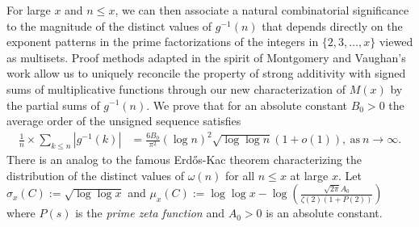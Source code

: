\documentclass[10pt,reqno,letterpaper]{article}
\theoremstyle{plain}
\numberwithin{theorem}{section}
\theoremstyle{definition}
\begin{document}
For large $x$ and $n \leq x$, we can then associate a natural combinatorial 
significance to the magnitude of the distinct values of 
$g^{-1}(n)$ that depends directly on the exponent patterns in the 
prime factorizations of the integers in $\{2,3,\ldots,x\}$ viewed as multisets.
Proof methods adapted in the spirit of Montgomery and Vaughan's work \cite{MV} 
allow us to uniquely reconcile the property of strong additivity with signed sums of 
multiplicative functions through our new characterization of 
$M(x)$ by the partial sums of $g^{-1}(n)$. 
We prove 
that for an absolute constant $B_0 > 0$ the average order 
of the unsigned sequence satisfies 
\begin{align*}
\frac{1}{n} \times \sum_{k \leq n} |g^{-1}(k)| & = 
     \frac{6B_0 }{\pi^2} (\log n)^2\sqrt{\log\log n} (1+o(1)), 
     \mathrm{\ as\ } n \rightarrow \infty. 
\end{align*}
There is an analog to the famous Erd\H{o}s-Kac theorem 
\cite{BILLINGSLY-CLT-PRIMEDIVFUNC,ERDOS-KAC-REF} 
characterizing the 
distribution of the distinct values of $\omega(n)$ for all $n \leq x$ at large $x$. 
Let $\sigma_x(C) := \sqrt{\log\log x}$ and 
$\mu_x(C) := \log\log x - \log\left(\frac{\sqrt{2\pi}A_0}{\zeta(2)(1+P(2))}\right)$ where 
$P(s)$ is the \emph{prime zeta function} \cite{FROBERG-1968} and $A_0 > 0$ is an absolute constant. 
\end{document}
